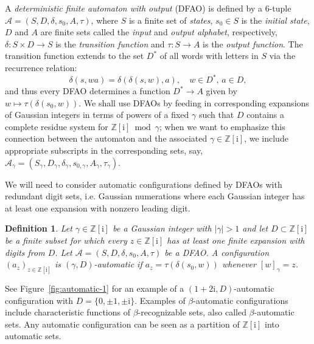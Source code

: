 \documentclass{amsart}
\newcommand{\Z}{\mathbb{Z}}
\newcommand{\ii}{\mathrm{i}}
\newtheorem*{main theorem}{Theorem \ref{thm:main-gaussian}}
\newtheorem{definition}[theorem]{Definition}
\theoremstyle{definition}
\begin{document}
    A \emph{deterministic finite automaton with output} (DFAO) is defined by a $6$-tuple $\mathcal{A}=(S,D,\delta,s_0,A,\tau)$, where $S$ is a finite set of \emph{states}, $s_0\in S$ is the \emph{initial state}, $D$ and $A$ are finite sets called the \emph{input} and \emph{output alphabet}, respectively, $\delta\colon S\times D\to S$ is the \emph{transition function} and $\tau\colon S\to A$ is the \emph{output function}. The transition function extends to the set $D^*$ of all words with letters in $S$ via the recurrence relation:
        \[\delta(s,wa)=\delta(\delta(s,w),a),\quad w\in D^*,\,a\in D, \]
    and thus every DFAO determines a function $D^*\to A$ given by $w\mapsto\tau(\delta(s_0,w))$.
We shall use DFAOs by feeding in corresponding expansions of Gaussian integers in terms of powers of a fixed $\gamma$ such that $D$ contains a complete residue system for $\Z[\ii] \bmod \gamma$; when we want to emphasize this connection between the automaton and the associated $\gamma\in\Z[\ii]$, we include appropriate subscripts in the corresponding sets, say, $\mathcal{A}_\gamma=(S_\gamma,D_\gamma,\delta_\gamma,s_{0,\gamma},A_\gamma,\tau_\gamma)$.  



We will need to consider automatic configurations defined by DFAOs with redundant digit sets, i.e. Gaussian numerations where each Gaussian integer has at least one expansion with nonzero leading digit.



\begin{definition}\label{def:automaton}
    Let   $\gamma\in\Z[\ii]$ be a  Gaussian integer with $|\gamma|>1$ and let $D\subset\Z[\ii]$ be a finite subset   for which every $z\in\Z[\ii]$ has  at least one finite expansion with digits from $D$. Let  $\mathcal{A}=(S,D,\delta,s_0,A,\tau)$ be a DFAO. A configuration $(a_z)_{z\in \Z[\ii]}$ is $(\gamma,D)$-\emph{automatic} if  
   $a_z=\tau(\delta(s_0, w))$ whenever $[w]_\gamma =z$. 
\end{definition}

See Figure~\ref{fig:automatic-1} for an example of a $(1+2\ii, D)$-automatic configuration with  $D=\{0,\pm 1,\pm \ii\}$.
Examples of $\beta$-automatic configurations include characteristic functions of  $\beta$-recognizable sets, also called $\beta$-automatic sets. Any automatic configuration  can be seen as a  partition of $\Z[\ii]$ into automatic sets.
\end{document}
